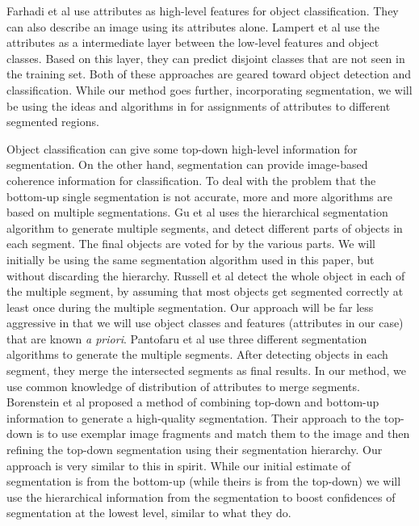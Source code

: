 \documentclass[10pt,twocolumn,letterpaper]{article}
\begin{document}
Farhadi et al
\cite{farhadi09} use attributes as high-level features for object classification. They
can also describe an image using its attributes alone.
Lampert et al \cite{lampert09}
use the attributes as a intermediate layer between the low-level
features and object classes. Based on this layer, they can predict
disjoint classes that are not seen in the training set.  Both of these
approaches are geared toward object detection and classification.  While
our method goes further, incorporating segmentation, we will be using
the ideas and algorithms in \cite{farhadi09} for assignments of 
attributes to different segmented regions.

Object classification can give some top-down high-level information
for segmentation. On the other hand, segmentation can provide
image-based coherence information for classification. To deal with
the problem that the bottom-up single segmentation is not accurate,
more and more algorithms are based on multiple segmentations. Gu et
al \cite{gu09} uses the hierarchical segmentation algorithm to
generate multiple segments, and detect different parts of objects in
each segment. The final objects are voted for by the various parts.
We will initially be using the same segmentation algorithm used in
this paper, but without discarding the hierarchy.
Russell et al \cite{russell06} detect the whole object in each of
the multiple segment, by assuming that most objects get segmented
correctly at least once during the multiple segmentation. Our approach
will be far less aggressive in that we will use object classes and 
features (attributes in our case) that are known \emph{a priori}.
Pantofaru et
al \cite{pantofaru} use three different segmentation algorithms to
generate the multiple segments. After detecting objects in each
segment, they merge the intersected segments as final results. In
our method, we use common knowledge of distribution of attributes to
merge segments.
Borenstein et al \cite{borenstein04} proposed a method of combining top-down
and bottom-up information to generate a high-quality segmentation.  Their
approach to the top-down is to use exemplar image fragments and match them
to the image and then refining the top-down segmentation using their
segmentation hierarchy.  Our approach is very similar to this in spirit.
While our initial estimate of segmentation is from the bottom-up (while
theirs is from the top-down) we will use the hierarchical information
from the segmentation to boost confidences of segmentation at the lowest
level, similar to what they do.
\end{document}
